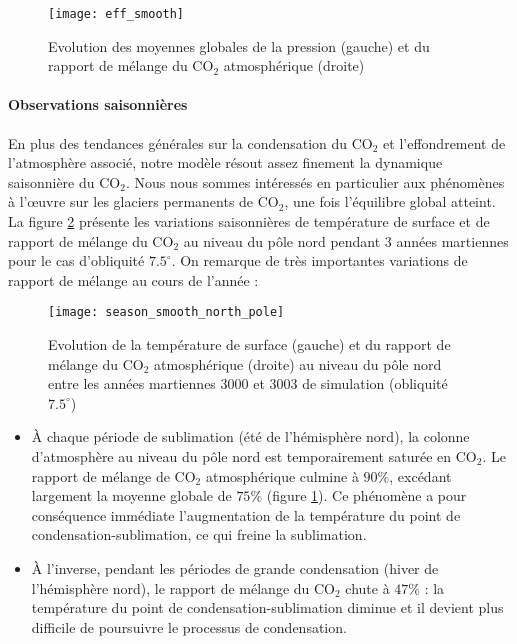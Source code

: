\documentclass[11pt,a4paper]{article}
\begin{document}
\begin{figure}[h!]
\begin{center}
\texttt{[image: eff\_smooth]}
\caption{Evolution des moyennes globales de la pression (gauche) et du rapport de mélange du CO$_2$ atmosphérique (droite)}
\label{eff_smooth}
\end{center}
\end{figure}

\paragraph{Observations saisonnières \\}
\label{seasonnal_var}
En plus des tendances générales sur la condensation du CO$_2$ et l'effondrement de l'atmosphère associé, notre modèle résout assez finement la dynamique saisonnière du CO$_2$. Nous nous sommes intéressés en particulier aux phénomènes à l'\oe uvre sur les glaciers permanents de CO$_2$, une fois l'équilibre global atteint. La figure \ref{season_smooth_north_pole} présente les variations saisonnières de température de surface et de rapport de mélange du CO$_2$ au niveau du pôle nord pendant 3 années martiennes pour le cas d'obliquité $7.5^\circ$. On remarque de très importantes variations de rapport de mélange au cours de l'année : 
\begin{figure}[h!]
\begin{center}
\texttt{[image: season\_smooth\_north\_pole]}
\caption{Evolution de la température de surface (gauche) et du rapport de mélange du CO$_2$ atmosphérique (droite) au niveau du pôle nord entre les années martiennes 3000 et 3003 de simulation (obliquité $7.5^\circ$) }
\label{season_smooth_north_pole}
\end{center}
\end{figure}
\begin{itemize}
\item À chaque période de sublimation (été de l'hémisphère nord), la colonne d'atmosphère au niveau du pôle nord est temporairement saturée en CO$_2$. Le rapport de mélange de CO$_2$ atmosphérique culmine à $90\%$, excédant largement la moyenne globale de $75\%$ (figure \ref{eff_smooth}). Ce phénomène a pour conséquence immédiate l'augmentation de la température du point de condensation-sublimation, ce qui freine la sublimation. 
\item À l'inverse, pendant les périodes de grande condensation (hiver de l'hémisphère nord), le rapport de mélange du CO$_2$ chute à $47\%$ : la température du point de condensation-sublimation diminue et il devient plus difficile de poursuivre le processus de condensation.\\ 
\end{itemize}
\end{document}
